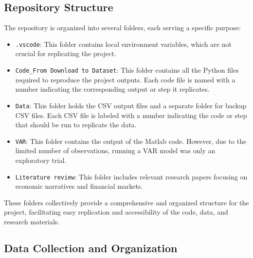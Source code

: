 \documentclass{article}
\begin{document}
\subsection{Repository Structure}

The repository is organized into several folders, each serving a specific purpose:

\begin{itemize}
    \item \texttt{.vscode}: This folder contains local environment variables, which are not crucial for replicating the project.
    
    \item \texttt{Code\_From Download to Dataset}: This folder contains all the Python files required to reproduce the project outputs. Each code file is named with a number indicating the corresponding output or step it replicates.
    
    \item \texttt{Data}: This folder holds the CSV output files and a separate folder for backup CSV files. Each CSV file is labeled with a number indicating the code or step that should be run to replicate the data.
    
    \item \texttt{VAR}: This folder contains the output of the Matlab code. However, due to the limited number of observations, running a VAR model was only an exploratory trial.
    
    \item \texttt{Literature review}: This folder includes relevant research papers focusing on economic narratives and financial markets.
\end{itemize}

These folders collectively provide a comprehensive and organized structure for the project, facilitating easy replication and accessibility of the code, data, and research materials.
\par

\subsection{Data Collection and Organization}
\end{document}
